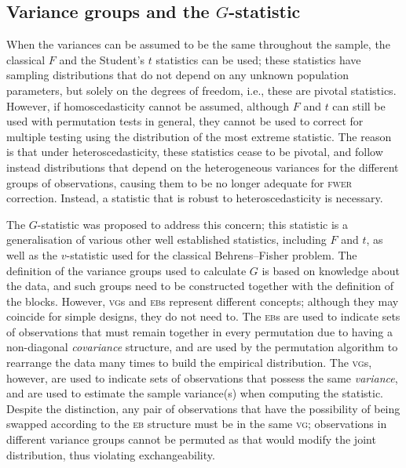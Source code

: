 \subsection{Variance groups and the $G$-statistic}

When the variances can be assumed to be the same throughout the sample, the classical $F$ and the Student's $t$ statistics can be used; these statistics have sampling distributions that do not depend on any unknown population parameters, but solely on the degrees of freedom, i.e., these are pivotal statistics. However, if homoscedasticity cannot be assumed, although $F$ and $t$ can still be used with permutation tests in general, they cannot be used to correct for multiple testing using the distribution of the most extreme statistic. The reason is that under heteroscedasticity, these statistics cease to be pivotal, and follow instead distributions that depend on the heterogeneous variances for the different groups of observations, causing them to be no longer adequate for \textsc{fwer} correction. Instead, a statistic that is robust to heteroscedasticity is necessary.

The $G$-statistic \citep{Winkler2014} was proposed to address this concern; this statistic is a generalisation of various other well established statistics, including $F$ and $t$, as well as the $v$-statistic used for the classical Behrens--Fisher problem. The definition of the variance groups used to calculate $G$ is based on knowledge about the data, and such groups need to be constructed together with the definition of the blocks. However, \textsc{vg}s and \textsc{eb}s represent different concepts; although they may coincide for simple designs, they do not need to. The \textsc{eb}s are used to indicate sets of observations that must remain together in every permutation due to having a non-diagonal \emph{covariance} structure, and are used by the permutation algorithm to rearrange the data many times to build the empirical distribution. The \textsc{vg}s, however, are used to indicate sets of observations that possess the same \emph{variance}, and are used to estimate the sample variance(s) when computing the statistic. Despite the distinction, any pair of observations that have the possibility of being swapped according to the \textsc{eb} structure must be in the same \textsc{vg}; observations in different variance groups cannot be permuted as that would modify the joint distribution, thus violating exchangeability.

